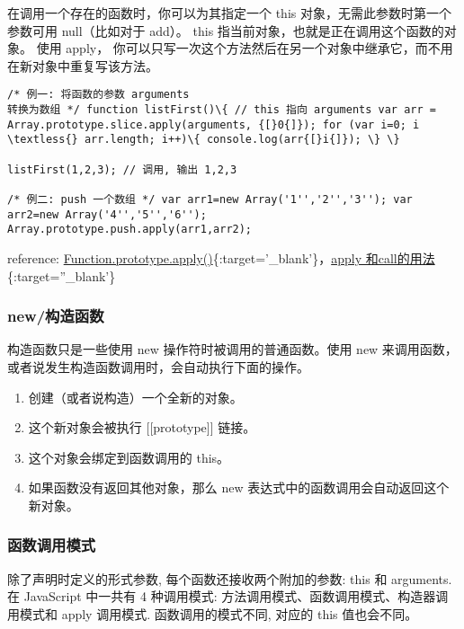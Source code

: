 在调用一个存在的函数时，你可以为其指定一个 this
对象，无需此参数时第一个参数可用 null（比如对于 add）。 this
指当前对象，也就是正在调用这个函数的对象。 使用 apply，
你可以只写一次这个方法然后在另一个对象中继承它，而不用在新对象中重复写该方法。

\begin{verbatim}/* 例一: 将函数的参数 arguments
转换为数组 */ function listFirst()\{ // this 指向 arguments var arr =
Array.prototype.slice.apply(arguments, {[}0{]}); for (var i=0; i
\textless{} arr.length; i++)\{ console.log(arr{[}i{]}); \} \}

listFirst(1,2,3); // 调用, 输出 1,2,3

/* 例二: push 一个数组 */ var arr1=new Array('1'','2'','3''); var
arr2=new Array('4'','5'','6'');
Array.prototype.push.apply(arr1,arr2); 
\end{verbatim}

reference:
\href{https://developer.mozilla.org/zh-CN/docs/Web/JavaScript/Reference/Global_Objects/Function/apply}{Function.prototype.apply()}\{:target='\_blank'\}，\href{http://segmentfault.com/a/1190000000725712}{apply
和call的用法}\{:target=''\_blank'\}

\subsubsection{new/构造函数}\label{newux6784ux9020ux51fdux6570}

构造函数只是一些使用 new 操作符时被调用的普通函数。使用 new
来调用函数，或者说发生构造函数调用时，会自动执行下面的操作。

\begin{enumerate}
\def\labelenumi{\arabic{enumi}.}
\tightlist
\item
  创建（或者说构造）一个全新的对象。
\item
  这个新对象会被执行 {[}{[}prototype{]}{]} 链接。
\item
  这个对象会绑定到函数调用的 this。
\item
  如果函数没有返回其他对象，那么 new
  表达式中的函数调用会自动返回这个新对象。
\end{enumerate}

\subsubsection{函数调用模式}\label{ux51fdux6570ux8c03ux7528ux6a21ux5f0f}

除了声明时定义的形式参数, 每个函数还接收两个附加的参数: this 和
arguments. 在 JavaScript 中一共有 4 种调用模式:
方法调用模式、函数调用模式、构造器调用模式和 apply 调用模式.
函数调用的模式不同, 对应的 this 值也会不同。


